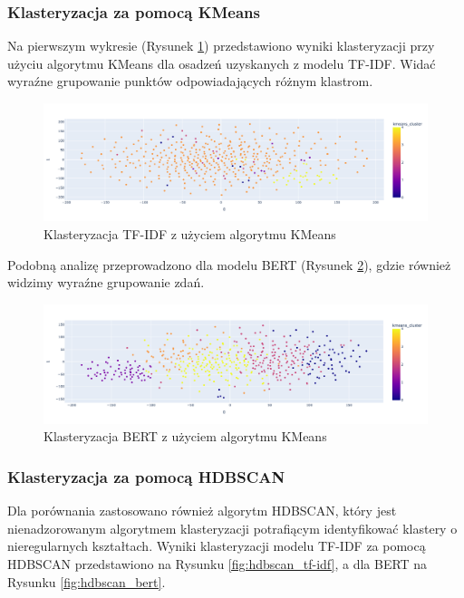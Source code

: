 \documentclass[12pt]{article}
\begin{document}
\subsubsection{Klasteryzacja za pomocą KMeans}

Na pierwszym wykresie (Rysunek \ref{fig:kmeans_tf-idf}) przedstawiono wyniki klasteryzacji przy użyciu algorytmu KMeans dla osadzeń uzyskanych z modelu TF-IDF. Widać wyraźne grupowanie punktów odpowiadających różnym klastrom.

\begin{figure}[H]
    \centering
    \includegraphics[width=\textwidth]{../../plots/tf-idf-kmeans-sentence.png}
    \caption{Klasteryzacja TF-IDF z użyciem algorytmu KMeans}
    \label{fig:kmeans_tf-idf}
\end{figure}

Podobną analizę przeprowadzono dla modelu BERT (Rysunek \ref{fig:kmeans_bert}), gdzie również widzimy wyraźne grupowanie zdań.

\begin{figure}[H]
    \centering
    \includegraphics[width=\textwidth]{../../plots/bert-kmeans-sentence.png}
    \caption{Klasteryzacja BERT z użyciem algorytmu KMeans}
    \label{fig:kmeans_bert}
\end{figure}

\subsubsection{Klasteryzacja za pomocą HDBSCAN}

Dla porównania zastosowano również algorytm HDBSCAN, który jest nienadzorowanym algorytmem klasteryzacji potrafiącym identyfikować klastery o nieregularnych kształtach. Wyniki klasteryzacji modelu TF-IDF za pomocą HDBSCAN przedstawiono na Rysunku \ref{fig:hdbscan_tf-idf}, a dla BERT na Rysunku \ref{fig:hdbscan_bert}.
\end{document}
